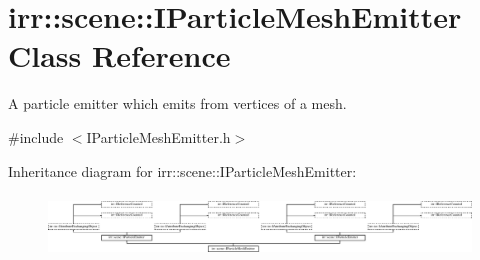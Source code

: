 \hypertarget{classirr_1_1scene_1_1IParticleMeshEmitter}{}\section{irr\+:\+:scene\+:\+:I\+Particle\+Mesh\+Emitter Class Reference}
\label{classirr_1_1scene_1_1IParticleMeshEmitter}


A particle emitter which emits from vertices of a mesh.  




{\ttfamily \#include $<$I\+Particle\+Mesh\+Emitter.\+h$>$}

Inheritance diagram for irr\+:\+:scene\+:\+:I\+Particle\+Mesh\+Emitter\+:\begin{figure}[H]
\begin{center}
\leavevmode
\includegraphics[height=1.682692cm]{classirr_1_1scene_1_1IParticleMeshEmitter}
\end{center}
\end{figure}
